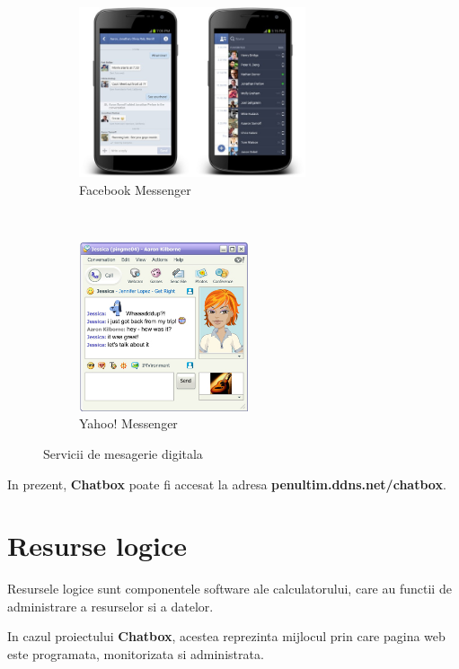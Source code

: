 \documentclass[12pt,a4paper]{article}
\begin{document}
\begin{figure}[h!]
        \centering
        \begin{subfigure}[b]{0.45\textwidth}
                \includegraphics[height=5cm]{img/fb_mess.jpg}
                \caption{Facebook Messenger}
        \end{subfigure}%
        ~ \qquad 
        \begin{subfigure}[b]{0.45\textwidth}
                \includegraphics[height=5cm]{img/yahoo_mess.jpg}
                \caption{Yahoo! Messenger}
        \end{subfigure}
        \caption{Servicii de mesagerie digitala}%
\end{figure}



In prezent, \textbf{Chatbox} poate fi accesat la adresa
\textbf{penultim.ddns.net/chatbox}.



\newpage
\section{Resurse logice}
Resursele logice sunt componentele software ale calculatorului, care au functii de administrare a resurselor si a datelor.

In cazul proiectului \textbf{Chatbox}, acestea reprezinta mijlocul prin care
pagina web este programata, monitorizata si administrata.
\end{document}

